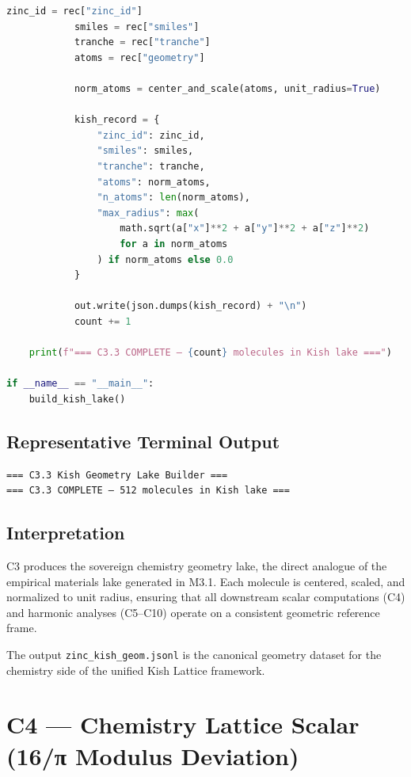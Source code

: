 \documentclass[11pt, letterpaper, openany]{book}
\begin{document}
\begin{lstlisting}[language=Python, caption={C3.3}]
            zinc_id = rec["zinc_id"]
            smiles = rec["smiles"]
            tranche = rec["tranche"]
            atoms = rec["geometry"]

            norm_atoms = center_and_scale(atoms, unit_radius=True)

            kish_record = {
                "zinc_id": zinc_id,
                "smiles": smiles,
                "tranche": tranche,
                "atoms": norm_atoms,
                "n_atoms": len(norm_atoms),
                "max_radius": max(
                    math.sqrt(a["x"]**2 + a["y"]**2 + a["z"]**2)
                    for a in norm_atoms
                ) if norm_atoms else 0.0
            }

            out.write(json.dumps(kish_record) + "\n")
            count += 1

    print(f"=== C3.3 COMPLETE — {count} molecules in Kish lake ===")

if __name__ == "__main__":
    build_kish_lake()
\end{lstlisting}

\subsection*{Representative Terminal Output}
\begin{lstlisting}[style=terminal]
=== C3.3 Kish Geometry Lake Builder ===
=== C3.3 COMPLETE — 512 molecules in Kish lake ===
\end{lstlisting}

\subsection*{Interpretation}
C3 produces the sovereign chemistry geometry lake, the direct analogue of the
empirical materials lake generated in M3.1. Each molecule is centered, scaled,
and normalized to unit radius, ensuring that all downstream scalar computations
(C4) and harmonic analyses (C5–C10) operate on a consistent geometric reference
frame.

The output \texttt{zinc\_kish\_geom.jsonl} is the canonical geometry dataset for
the chemistry side of the unified Kish Lattice framework.


\section{C4 — Chemistry Lattice Scalar (16/π Modulus Deviation)}
\end{document}
